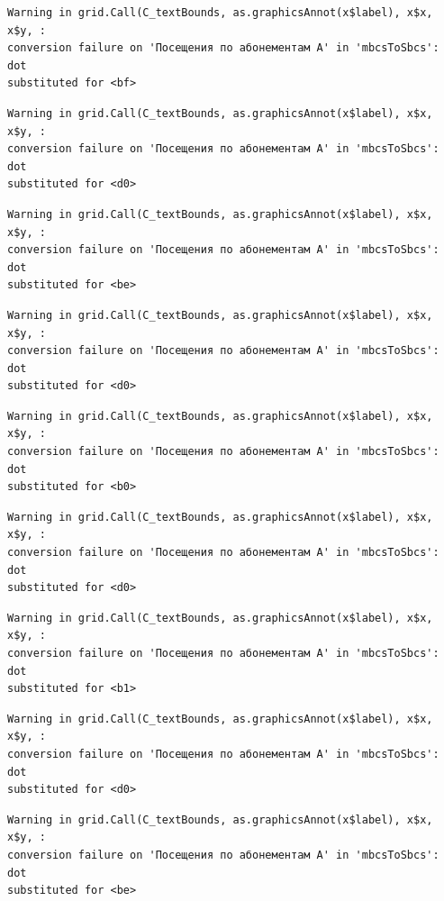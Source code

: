 \documentclass[
  letterpaper,
  DIV=11,
  numbers=noendperiod]{scrartcl}
\begin{document}
\begin{verbatim}
Warning in grid.Call(C_textBounds, as.graphicsAnnot(x$label), x$x, x$y, :
conversion failure on 'Посещения по абонементам А' in 'mbcsToSbcs': dot
substituted for <bf>
\end{verbatim}

\begin{verbatim}
Warning in grid.Call(C_textBounds, as.graphicsAnnot(x$label), x$x, x$y, :
conversion failure on 'Посещения по абонементам А' in 'mbcsToSbcs': dot
substituted for <d0>
\end{verbatim}

\begin{verbatim}
Warning in grid.Call(C_textBounds, as.graphicsAnnot(x$label), x$x, x$y, :
conversion failure on 'Посещения по абонементам А' in 'mbcsToSbcs': dot
substituted for <be>
\end{verbatim}

\begin{verbatim}
Warning in grid.Call(C_textBounds, as.graphicsAnnot(x$label), x$x, x$y, :
conversion failure on 'Посещения по абонементам А' in 'mbcsToSbcs': dot
substituted for <d0>
\end{verbatim}

\begin{verbatim}
Warning in grid.Call(C_textBounds, as.graphicsAnnot(x$label), x$x, x$y, :
conversion failure on 'Посещения по абонементам А' in 'mbcsToSbcs': dot
substituted for <b0>
\end{verbatim}

\begin{verbatim}
Warning in grid.Call(C_textBounds, as.graphicsAnnot(x$label), x$x, x$y, :
conversion failure on 'Посещения по абонементам А' in 'mbcsToSbcs': dot
substituted for <d0>
\end{verbatim}

\begin{verbatim}
Warning in grid.Call(C_textBounds, as.graphicsAnnot(x$label), x$x, x$y, :
conversion failure on 'Посещения по абонементам А' in 'mbcsToSbcs': dot
substituted for <b1>
\end{verbatim}

\begin{verbatim}
Warning in grid.Call(C_textBounds, as.graphicsAnnot(x$label), x$x, x$y, :
conversion failure on 'Посещения по абонементам А' in 'mbcsToSbcs': dot
substituted for <d0>
\end{verbatim}

\begin{verbatim}
Warning in grid.Call(C_textBounds, as.graphicsAnnot(x$label), x$x, x$y, :
conversion failure on 'Посещения по абонементам А' in 'mbcsToSbcs': dot
substituted for <be>
\end{verbatim}
\end{document}
